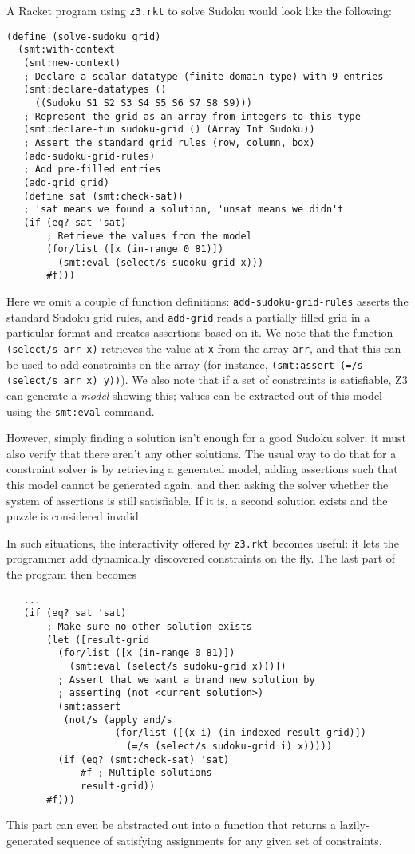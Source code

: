 A Racket program using \texttt{z3.rkt} to solve Sudoku would look like the
following:

\begin{verbatim}
(define (solve-sudoku grid)
  (smt:with-context
   (smt:new-context)
   ; Declare a scalar datatype (finite domain type) with 9 entries
   (smt:declare-datatypes ()
     ((Sudoku S1 S2 S3 S4 S5 S6 S7 S8 S9)))
   ; Represent the grid as an array from integers to this type
   (smt:declare-fun sudoku-grid () (Array Int Sudoku))
   ; Assert the standard grid rules (row, column, box)
   (add-sudoku-grid-rules)
   ; Add pre-filled entries
   (add-grid grid)
   (define sat (smt:check-sat))
   ; 'sat means we found a solution, 'unsat means we didn't
   (if (eq? sat 'sat)
       ; Retrieve the values from the model
       (for/list ([x (in-range 0 81)])
         (smt:eval (select/s sudoku-grid x)))
       #f)))
\end{verbatim}

Here we omit a couple of function definitions: \texttt{add-sudoku-grid-rules}
asserts the standard Sudoku grid rules, and \texttt{add-grid} reads a
partially filled grid in a particular format and creates assertions based on
it. We note that the function \texttt{(select/s arr x)} retrieves the value at
\texttt{x} from the array \texttt{arr}, and that this can be used to add
constraints on the array (for instance, \texttt{(smt:assert (=/s (select/s arr
x) y))}). We also note that if a set of constraints is satisfiable, Z3 can
generate a \textit{model} showing this; values can be extracted out of this
model using the \texttt{smt:eval} command.

However, simply finding a solution isn't enough for a good Sudoku solver: it
must also verify that there aren't any other solutions. The usual way to do
that for a constraint solver is by retrieving a generated model, adding
assertions such that this model cannot be generated again, and then asking the
solver whether the system of assertions is still satisfiable. If it is, a
second solution exists and the puzzle is considered invalid.

In such situations, the interactivity offered by \texttt{z3.rkt} becomes
useful: it lets the programmer add dynamically discovered constraints on the
fly. The last part of the program then becomes

\begin{verbatim}
   ...
   (if (eq? sat 'sat)
       ; Make sure no other solution exists
       (let ([result-grid
         (for/list ([x (in-range 0 81)])
           (smt:eval (select/s sudoku-grid x)))])
         ; Assert that we want a brand new solution by
         ; asserting (not <current solution>)
         (smt:assert
          (not/s (apply and/s
                   (for/list ([(x i) (in-indexed result-grid)])
                     (=/s (select/s sudoku-grid i) x)))))
         (if (eq? (smt:check-sat) 'sat)
             #f ; Multiple solutions
             result-grid))
       #f)))
\end{verbatim}

This part can even be abstracted out into a function that returns a
lazily-generated sequence of satisfying assignments for any given set
of constraints.
